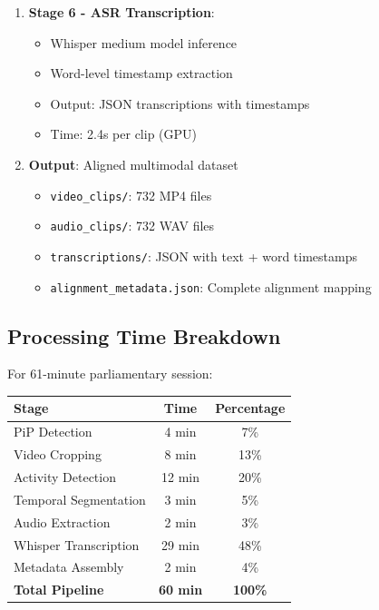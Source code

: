 \documentclass[11pt,a4paper]{article}
\begin{document}
\begin{enumerate}
    \item \textbf{Stage 6 - ASR Transcription}:
    \begin{itemize}
        \item Whisper medium model inference
        \item Word-level timestamp extraction
        \item Output: JSON transcriptions with timestamps
        \item Time: 2.4s per clip (GPU)
    \end{itemize}
    
    \item \textbf{Output}: Aligned multimodal dataset
    \begin{itemize}
        \item \texttt{video\_clips/}: 732 MP4 files
        \item \texttt{audio\_clips/}: 732 WAV files
        \item \texttt{transcriptions/}: JSON with text + word timestamps
        \item \texttt{alignment\_metadata.json}: Complete alignment mapping
    \end{itemize}
\end{enumerate}

\subsection{Processing Time Breakdown}

For 61-minute parliamentary session:

\begin{center}
\begin{tabular}{@{}lcc@{}}
\toprule
\textbf{Stage} & \textbf{Time} & \textbf{Percentage} \\ \midrule
PiP Detection & 4 min & 7\% \\
Video Cropping & 8 min & 13\% \\
Activity Detection & 12 min & 20\% \\
Temporal Segmentation & 3 min & 5\% \\
Audio Extraction & 2 min & 3\% \\
Whisper Transcription & 29 min & 48\% \\
Metadata Assembly & 2 min & 4\% \\
\midrule
\textbf{Total Pipeline} & \textbf{60 min} & \textbf{100\%} \\
\bottomrule
\end{tabular}
\end{center}
\end{document}
